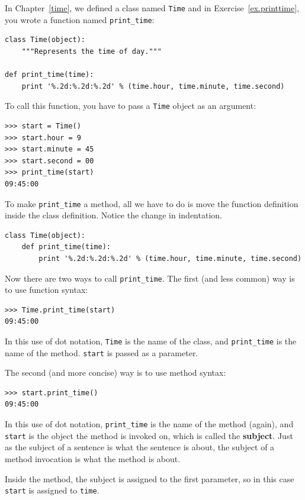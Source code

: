 \documentclass[10pt]{book}
\begin{document}
\begin{CJK}{UTF8}{gbsn}
In Chapter~\ref{time}, we defined a class named
{\tt Time} and in Exercise~\ref{ex.printtime}, you 
wrote a function named \verb"print_time":

\begin{verbatim}
class Time(object):
    """Represents the time of day."""

def print_time(time):
    print '%.2d:%.2d:%.2d' % (time.hour, time.minute, time.second)
\end{verbatim}
%
To call this function, you have to pass a {\tt Time} object as an
argument:

\begin{verbatim}
>>> start = Time()
>>> start.hour = 9
>>> start.minute = 45
>>> start.second = 00
>>> print_time(start)
09:45:00
\end{verbatim}
%
To make \verb"print_time" a method, all we have to do is
move the function definition inside the class definition.  Notice
the change in indentation.

\begin{verbatim}
class Time(object):
    def print_time(time):
        print '%.2d:%.2d:%.2d' % (time.hour, time.minute, time.second)
\end{verbatim}
%
Now there are two ways to call \verb"print_time".  The first
(and less common) way is to use function syntax:


\begin{verbatim}
>>> Time.print_time(start)
09:45:00
\end{verbatim}
%
In this use of dot notation, {\tt Time} is the name of the class,
and \verb"print_time" is the name of the method.  {\tt start} is
passed as a parameter.

The second (and more concise) way is to use method syntax:

\begin{verbatim}
>>> start.print_time()
09:45:00
\end{verbatim}
%
In this use of dot notation, \verb"print_time" is the name of the
method (again), and {\tt start} is the object the method is
invoked on, which is called the {\bf subject}.  Just as the
subject of a sentence is what the sentence is about, the subject
of a method invocation is what the method is about.

Inside the method, the subject is assigned to the first
parameter, so in this case {\tt start} is assigned
to {\tt time}.


\end{CJK}
\end{document}
